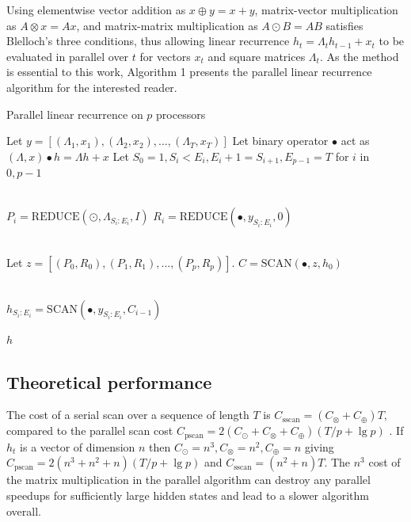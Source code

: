 \documentclass{article}
\providecommand{\scan}{\text{SCAN}}
\providecommand{\reduce}{\text{REDUCE}}
\begin{document}
Using elementwise vector addition as $x \oplus y= x+y$, matrix-vector multiplication as $A \otimes x=Ax$,
and matrix-matrix multiplication as $A \odot B=AB$ satisfies Blelloch's three conditions, thus allowing linear
recurrence $h_t = \Lambda_t h_{t-1} + x_t$ to be evaluated in parallel over $t$ for
vectors $x_t$ and square matrices $\Lambda_t$. As the method is
essential to this work, Algorithm 1 presents the parallel linear recurrence algorithm
for the interested reader.
\begin{algorithm}
\caption{Parallel linear recurrence on $p$ processors}
\begin{algorithmic}[1]
  \State Let $y = [(\Lambda_1, x_1), (\Lambda_2, x_2), ..., (\Lambda_T, x_T)]$
  \State Let binary operator $\bullet$ act as $(\Lambda, x) \bullet h = \Lambda h + x$
  \State Let $S_0=1, S_i < E_i, E_i + 1 = S_{i+1}, E_{p-1}=T$ for $i$ in $0,p-1$

  \\
    \State $P_i = \reduce(\odot, \Lambda_{S_i:E_i}, I)$
    \State $R_i = \reduce(\bullet, y_{S_i:E_i}, 0)$
  \EndParFor

  \\
  \State Let $z = [(P_0, R_0), (P_1, R_1), ..., (P_p, R_p)]$.
  \State $C = \scan(\bullet, z, h_0)$   

  \\
    \State $h_{S_i:E_i} = \scan(\bullet, y_{S_i:E_i}, C_{i-1})$
  \EndParFor
  
  \State \Return $h$
\end{algorithmic}
\end{algorithm}

\subsection{Theoretical performance}
The cost of a serial scan over a sequence of length $T$ is 
$C_\text{sscan} = (C_\otimes + C_\oplus)T$, compared to the parallel scan cost
$C_\text{pscan} = 2(C_\odot + C_\otimes + C_\oplus)(T/p + \lg p)$ \cite{blelloch1990prefix}.
If $h_t$ is a vector of dimension $n$ then 
$C_\odot=n^3, C_\otimes=n^2, C_\oplus=n$ giving
$C_\text{pscan} = 2(n^3 + n^2 + n)(T/p + \lg p)$ and 
$C_\text{sscan} = (n^2 + n)T$. The $n^3$ cost of the matrix
multiplication in the parallel algorithm can destroy any parallel speedups for
sufficiently large hidden states and lead to a slower algorithm overall.
\end{document}
